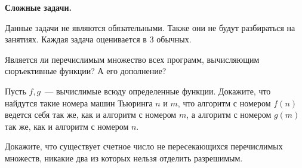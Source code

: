 \setcounter{curtask}{1}

\begin{center}
    \textbf{Сложные задачи.}
\end{center}

Данные задачи не являются обязательными. Также они не будут разбираться на
занятиях. Каждая задача оценивается в $3$ обычных.

\begin{task}
    Является ли перечислимым множество всех программ, вычисляющим
    сюръективные функции? А его дополнение?
\end{task}

\begin{task}
    Пусть $f, g$~--- вычислимые всюду определенные функции. Докажите, что найдутся
	такие номера машин Тьюринга $n$ и $m$, что алгоритм с номером $f(n)$ ведется себя
    так же, как и алгоритм с номером $m$, а алгоритм с номером $g(m)$ так же, как и
    алгоритм с номером $n$.
\end{task}

\begin{task}
    Докажите, что существует счетное число не пересекающихся перечислимых множеств,
    никакие два из которых нельзя отделить разрешимым.
\end{task}

